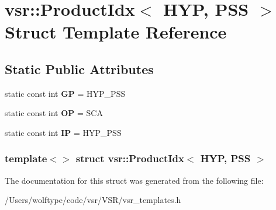 \hypertarget{structvsr_1_1_product_idx_3_01_h_y_p_00_01_p_s_s_01_4}{\section{vsr\-:\-:Product\-Idx$<$ H\-Y\-P, P\-S\-S $>$ Struct Template Reference}
\label{structvsr_1_1_product_idx_3_01_h_y_p_00_01_p_s_s_01_4}
}
\subsection*{Static Public Attributes}
\begin{DoxyCompactItemize}
\item 
\hypertarget{structvsr_1_1_product_idx_3_01_h_y_p_00_01_p_s_s_01_4_a8e4393f8ec3a0d0c51b14b63cc0c1822}{static const int {\bfseries G\-P} = H\-Y\-P\-\_\-\-P\-S\-S}\label{structvsr_1_1_product_idx_3_01_h_y_p_00_01_p_s_s_01_4_a8e4393f8ec3a0d0c51b14b63cc0c1822}

\item 
\hypertarget{structvsr_1_1_product_idx_3_01_h_y_p_00_01_p_s_s_01_4_a49356281da8488277c9d335c94af99a5}{static const int {\bfseries O\-P} = S\-C\-A}\label{structvsr_1_1_product_idx_3_01_h_y_p_00_01_p_s_s_01_4_a49356281da8488277c9d335c94af99a5}

\item 
\hypertarget{structvsr_1_1_product_idx_3_01_h_y_p_00_01_p_s_s_01_4_a3b971e2c4f744cf7051e5504dec5facf}{static const int {\bfseries I\-P} = H\-Y\-P\-\_\-\-P\-S\-S}\label{structvsr_1_1_product_idx_3_01_h_y_p_00_01_p_s_s_01_4_a3b971e2c4f744cf7051e5504dec5facf}

\end{DoxyCompactItemize}
\subsubsection*{template$<$$>$ struct vsr\-::\-Product\-Idx$<$ H\-Y\-P, P\-S\-S $>$}



The documentation for this struct was generated from the following file\-:\begin{DoxyCompactItemize}
\item 
/\-Users/wolftype/code/vsr/\-V\-S\-R/vsr\-\_\-templates.\-h\end{DoxyCompactItemize}
